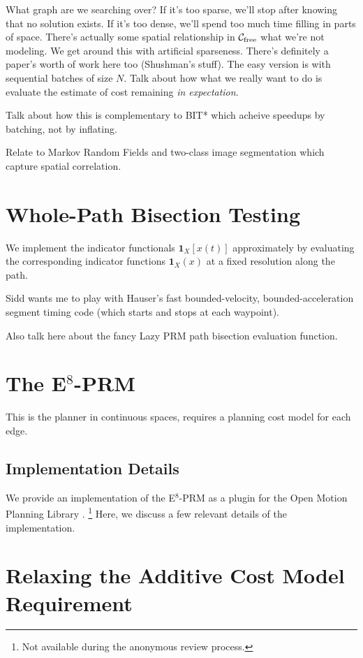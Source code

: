 What graph are we searching over?
If it's too sparse, we'll stop after knowing that no solution exists.
If it's too dense, we'll spend too much time filling in parts of
space.
There's actually some spatial relationship in
$\mathcal{C}_{\mbox{\scriptsize free}}$ what we're not
modeling.
We get around this with artificial sparseness.
There's definitely a paper's worth of work here too (Shushman's stuff).
The easy version is with sequential batches of size $N$.
Talk about how what we really want to do
is evaluate the estimate of cost remaining
\emph{in expectation}.

Talk about how this is complementary to BIT* which acheive speedups
by batching, not by inflating.

Relate to Markov Random Fields and two-class image segmentation
which capture spatial correlation.

\section{Whole-Path Bisection Testing}

We implement the indicator functionals $\mathbf{1}_X[x(t)]$
approximately by evaluating the corresponding indicator functions
$\mathbf{1}_X(x)$ at a fixed resolution along the path.

Sidd wants me to play with Hauser's fast bounded-velocity,
bounded-acceleration segment timing code
(which starts and stops at each waypoint).

Also talk here about the fancy Lazy PRM path bisection
evaluation function.

\section{The E$^8$-PRM}

This is the planner in continuous spaces,
requires a planning cost model for each edge.

\subsection{Implementation Details}
\label{subsec:implementation-details}

We provide an implementation of the E$^8$-PRM
as a plugin for the Open Motion Planning Library \cite{sucan2012ompl}.%
\footnote{Not available during the anonymous review process.}
Here, we discuss a few relevant details of the implementation.

\section{Relaxing the Additive Cost Model Requirement}

